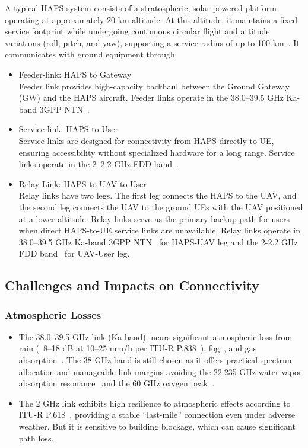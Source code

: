 \documentclass[conference]{IEEEtran}
\begin{document}
A typical HAPS system consists of a stratospheric, solar-powered platform operating at approximately 20 km altitude. At this altitude, it maintains a fixed service footprint while undergoing continuous circular flight and attitude variations (roll, pitch, and yaw), supporting a service radius of up to 100 km~\cite{itu_m2101,itu_m2106}. It communicates with ground equipment through

\begin{itemize}
  \item {Feeder-link: HAPS to Gateway} \\
    Feeder link provides high-capacity backhaul between the Ground Gateway (GW) and the HAPS aircraft. Feeder links operate in the 38.0--39.5 GHz Ka-band 3GPP NTN~\cite{3gpp_ts38821}.

  \item { Service link:  HAPS to User} \\
 Service links are designed for connectivity from HAPS directly to  UE, ensuring accessibility without specialized hardware for a long range. Service links operate in the 2--2.2 GHz FDD band~\cite{3gpp_ts38821}.

  \item {Relay Link: HAPS to UAV to User} \\ 
  Relay links have two legs. The first leg connects the HAPS to the UAV, and the second leg connects the UAV to the ground UEs with the UAV positioned at a lower altitude. Relay links serve as the primary backup path for users when direct HAPS-to-UE service links are unavailable. Relay links operate in 38.0--39.5 GHz Ka-band 3GPP NTN~\cite{3gpp_ts38821} for HAPS-UAV leg and the 2-2.2 GHz FDD band~\cite{3gpp_ts38821} for UAV-User leg.

\end{itemize}

\subsection{Challenges and Impacts on Connectivity}
\subsubsection{Atmospheric Losses}
\begin{itemize}
  \item The 38.0--39.5 GHz link (Ka-band) incurs significant atmospheric loss from rain (~8--18 dB at 10--25 mm/h per ITU-R P.838~\cite{itu_p838}), fog~\cite{itu_p840}, and gas absorption~\cite{itu_p676}. The 38 GHz band is still chosen as it offers practical spectrum allocation and manageable link margins avoiding the 22.235 GHz water-vapor absorption resonance~\cite{itu_p676} and the 60 GHz oxygen peak~\cite{itu_p676}.
  \item The 2 GHz link exhibits high resilience to atmospheric effects according to ITU-R P.618~\cite{itu_p618}, providing a stable ``last-mile'' connection even under adverse weather. But it is sensitive to building blockage, which can cause significant path loss.
\end{itemize}
\end{document}
